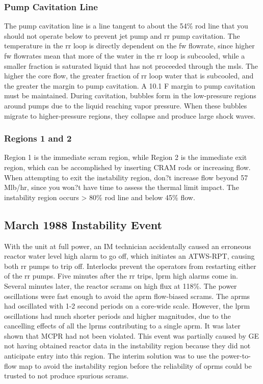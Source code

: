 \documentclass[10pt]{article}
\begin{document}
\subsubsection{Pump Cavitation Line}
The pump cavitation line is a line tangent to about the 54\% rod line that you should not operate below to prevent jet pump and \gls{rr} pump cavitation. The temperature in the \gls{rr} loop is directly dependent on the \gls{fw} flowrate, since higher \gls{fw} flowrates mean that more of the water in the \gls{rr} loop is subcooled, while a smaller fraction is saturated liquid that has not proceeded through the \gls{msl}s. The higher the core flow, the greater fraction of \gls{rr} loop water that is subcooled, and the greater the margin to pump cavitation. A 10.1 \degree F margin to pump cavitation must be maintained. During cavitation, bubbles form in the low-pressure regions around pumps due to the liquid reaching vapor pressure. When these bubbles migrate to higher-pressure regions, they collapse and produce large shock waves. 

\subsubsection{Regions 1 and 2}
Region 1 is the immediate scram region, while Region 2 is the immediate exit region, which can be accomplished by inserting CRAM rods or increasing flow. When attempting to exit the instability region, don?t increase flow beyond 57 Mlb/hr, since you won?t have time to assess the thermal limit impact. The instability region occurs > 80\% rod line and below 45\% flow. 

\subsection{March 1988 Instability Event}
With the unit at full power, an IM technician accidentally caused an erroneous reactor water level high alarm to go off, which initiates an ATWS-RPT, causing both \gls{rr} pumps to trip off. Interlocks prevent the operators from restarting either of the \gls{rr} pumps. Five minutes after the \gls{rr} trips, \gls{lprm} high alarms come in. Several minutes later, the reactor scrams on high flux at 118\%. The power oscillations were fast enough to avoid the \gls{aprm} flow-biased scrams. The \gls{aprm}s had oscillated with 1-2 second periods on a core-wide scale. However, the \gls{lprm} oscillations had much shorter periods and higher magnitudes, due to the cancelling effects of all the \gls{lprm}s contributing to a single \gls{aprm}. It was later shown that MCPR had not been violated. This event was partially caused by GE not having obtained reactor data in the instability region because they did not anticipate entry into this region. The interim solution was to use the power-to-flow map to avoid the instability region before the reliability of \gls{oprm}s could be trusted to not produce spurious scrams. 
\end{document}
